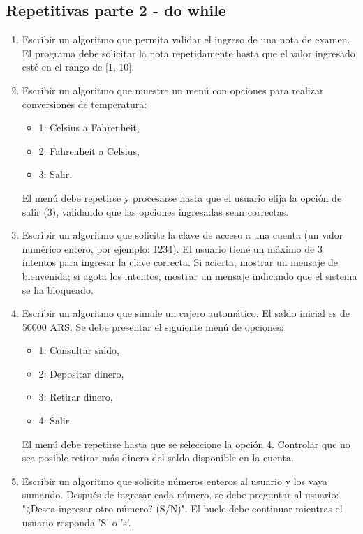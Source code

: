 \begin{ejercicioClase}
  \subsection*{Repetitivas parte 2 - do while}
  \begin{enumerate}
    \item Escribir un algoritmo que permita validar el ingreso de una nota de examen. El programa debe solicitar la nota repetidamente hasta que el valor ingresado esté en el rango de [1, 10].
    \item Escribir un algoritmo que muestre un menú con opciones para realizar conversiones de temperatura:
      \begin{itemize}
        \item 1: Celsius a Fahrenheit,
        \item 2: Fahrenheit a Celsius,
        \item 3: Salir.
      \end{itemize}
      El menú debe repetirse y procesarse hasta que el usuario elija la opción de salir (3), validando que las opciones ingresadas sean correctas.
    \item Escribir un algoritmo que solicite la clave de acceso a una cuenta (un valor numérico entero, por ejemplo: 1234). El usuario tiene un máximo de 3 intentos para ingresar la clave correcta. Si acierta, mostrar un mensaje de bienvenida; si agota los intentos, mostrar un mensaje indicando que el sistema se ha bloqueado.
    \item Escribir un algoritmo que simule un cajero automático. El saldo inicial es de 50000 ARS. Se debe presentar el siguiente menú de opciones:
      \begin{itemize}
        \item 1: Consultar saldo,
        \item 2: Depositar dinero,
        \item 3: Retirar dinero,
        \item 4: Salir.
      \end{itemize}
      El menú debe repetirse hasta que se seleccione la opción 4. Controlar que no sea posible retirar más dinero del saldo disponible en la cuenta.
    \item Escribir un algoritmo que solicite números enteros al usuario y los vaya sumando. Después de ingresar cada número, se debe preguntar al usuario: "¿Desea ingresar otro número? (S/N)". El bucle debe continuar mientras el usuario responda 'S' o 's'.

\end{enumerate}
\end{ejercicioClase}
